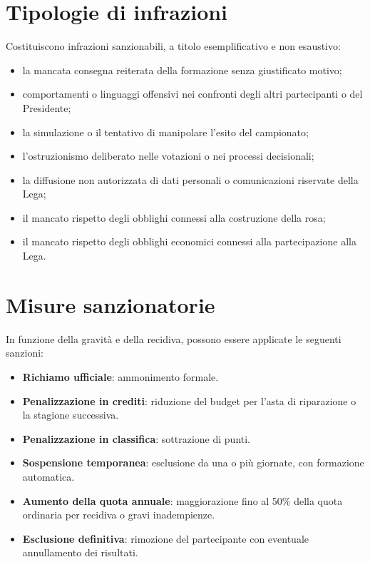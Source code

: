 \section{Tipologie di infrazioni}
\label{art:3.2}

\noindent
Costituiscono infrazioni sanzionabili, a titolo esemplificativo e non esaustivo:
\begin{itemize}
\item la mancata consegna reiterata della formazione senza giustificato motivo;
\item comportamenti o linguaggi offensivi nei confronti degli altri partecipanti o del Presidente;
\item la simulazione o il tentativo di manipolare l'esito del campionato;
\item l'ostruzionismo deliberato nelle votazioni o nei processi decisionali;
\item la diffusione non autorizzata di dati personali o comunicazioni riservate della Lega;
\item il mancato rispetto degli obblighi connessi alla costruzione della rosa;
\item il mancato rispetto degli obblighi economici connessi alla partecipazione alla Lega.
\end{itemize}

\section{Misure sanzionatorie}
\label{art:3.3}

\noindent
In funzione della gravità e della recidiva, possono essere applicate le seguenti sanzioni:
\begin{itemize}
\item \textbf{Richiamo ufficiale}: ammonimento formale.
\item \textbf{Penalizzazione in crediti}: riduzione del budget per l'asta di riparazione o la stagione successiva.
\item \textbf{Penalizzazione in classifica}: sottrazione di punti.
\item \textbf{Sospensione temporanea}: esclusione da una o più giornate, con formazione automatica.
\item \textbf{Aumento della quota annuale}: maggiorazione fino al 50\% della quota ordinaria per recidiva o gravi inadempienze.
\item \textbf{Esclusione definitiva}: rimozione del partecipante con eventuale annullamento dei risultati.
\end{itemize}

